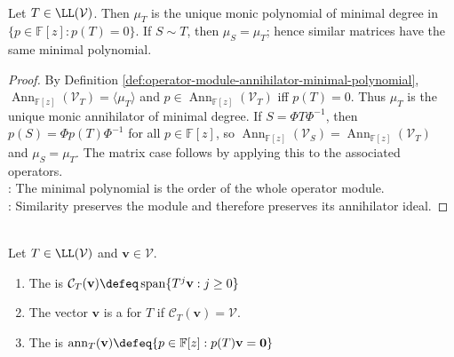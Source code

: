 \begin{proposition} \label{prop:minimal-polynomial-module-order} \\
Let $T\in\LL(\mathcal{V})$. Then $\mu_T$ is the unique monic polynomial of minimal degree in $\{p\in\mathbb{F}[z]:p(T)=0\}$. If $S\sim T$, then $\mu_S=\mu_T$; hence similar matrices have the same minimal polynomial.
\begin{proof}
By Definition \ref{def:operator-module-annihilator-minimal-polynomial}, $\operatorname{Ann}_{\mathbb{F}[z]}(\mathcal{V}_T)=\langle\mu_T\rangle$ and $p\in\operatorname{Ann}_{\mathbb{F}[z]}(\mathcal{V}_T)$ iff $p(T)=0$. Thus $\mu_T$ is the unique monic annihilator of minimal degree. If $S=\Phi T\Phi^{-1}$, then $p(S)=\Phi p(T)\Phi^{-1}$ for all $p\in\mathbb{F}[z]$, so $\operatorname{Ann}_{\mathbb{F}[z]}(\mathcal{V}_S)=\operatorname{Ann}_{\mathbb{F}[z]}(\mathcal{V}_T)$ and $\mu_S=\mu_T$. The matrix case follows by applying this to the associated operators.\\
: The minimal polynomial is the order of the whole operator module.\\
: Similarity preserves the module and therefore preserves its annihilator ideal.
\end{proof}
\end{proposition}

\begin{definition} \label{def:cyclic-subspace-and-vector-annihilator} \\
Let $T\in\LL(\mathcal{V})$ and $\mathbf{v}\in\mathcal{V}$.
\begin{enumerate}[label=(\roman*)]
\setlength{\itemsep}{0pt}
\item The  is $\mathcal{C}_T(\mathbf{v})\defeq\operatorname{span}\{T^j\mathbf{v}:j\geq0\}$
\item The vector $\mathbf{v}$ is a  for $T$ if $\mathcal{C}_T(\mathbf{v})=\mathcal{V}$.
\item The  is $\operatorname{ann}_T(\mathbf{v})\defeq\{p\in\mathbb{F}[z]:p(T)\mathbf{v}=\mathbf{0}\}$
\end{enumerate}
\end{definition}

